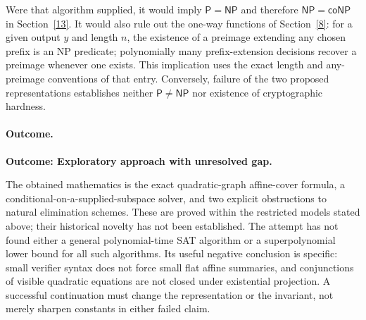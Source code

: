 \documentclass[11pt]{article}
\begin{document}
Were that algorithm supplied, it would imply $\mathsf P=\mathsf{NP}$ and
therefore $\mathsf{NP}=\mathsf{coNP}$ in Section~\ref{13}. It would also rule
out the one-way functions of Section~\ref{8}: for a given output $y$ and
length $n$, the existence of a preimage extending any chosen prefix is an NP
predicate; polynomially many prefix-extension decisions recover a preimage
whenever one exists. This implication uses the exact length and any-preimage
conventions of that entry. Conversely, failure of the two proposed
representations establishes neither $\mathsf P\ne\mathsf{NP}$ nor existence
of cryptographic hardness.

\paragraph{Outcome.}
\textbf{Outcome: Exploratory approach with unresolved gap.}

The obtained mathematics is the exact quadratic-graph affine-cover formula,
a conditional-on-a-supplied-subspace solver, and two explicit obstructions to
natural elimination schemes. These are proved within the restricted models
stated above; their historical novelty has not been established. The attempt
has not found either a general polynomial-time SAT algorithm or a
superpolynomial lower bound for all such algorithms. Its useful negative
conclusion is specific: small verifier syntax does not force small flat
affine summaries, and conjunctions of visible quadratic equations are not
closed under existential projection. A successful continuation must change
the representation or the invariant, not merely sharpen constants in either
failed claim.
\end{document}
